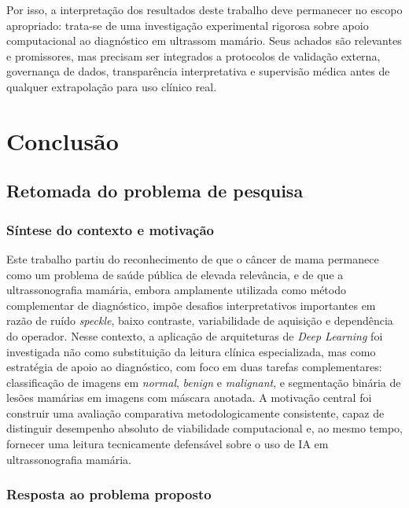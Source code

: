 \documentclass[tcc,capa]{texufpel}
\begin{document}
Por isso, a interpretação dos resultados deste trabalho deve permanecer no escopo apropriado: trata-se de uma investigação experimental rigorosa sobre apoio computacional ao diagnóstico em ultrassom mamário. Seus achados são relevantes e promissores, mas precisam ser integrados a protocolos de validação externa, governança de dados, transparência interpretativa e supervisão médica antes de qualquer extrapolação para uso clínico real.

\chapter{Conclusão}

\section{Retomada do problema de pesquisa}

\subsection{Síntese do contexto e motivação}

Este trabalho partiu do reconhecimento de que o câncer de mama permanece como um problema de saúde pública de elevada relevância, e de que a ultrassonografia mamária, embora amplamente utilizada como método complementar de diagnóstico, impõe desafios interpretativos importantes em razão de ruído \textit{speckle}, baixo contraste, variabilidade de aquisição e dependência do operador. Nesse contexto, a aplicação de arquiteturas de \textit{Deep Learning} foi investigada não como substituição da leitura clínica especializada, mas como estratégia de apoio ao diagnóstico, com foco em duas tarefas complementares: classificação de imagens em \textit{normal}, \textit{benign} e \textit{malignant}, e segmentação binária de lesões mamárias em imagens com máscara anotada. A motivação central foi construir uma avaliação comparativa metodologicamente consistente, capaz de distinguir desempenho absoluto de viabilidade computacional e, ao mesmo tempo, fornecer uma leitura tecnicamente defensável sobre o uso de IA em ultrassonografia mamária. 

\subsection{Resposta ao problema proposto}
\end{document}
